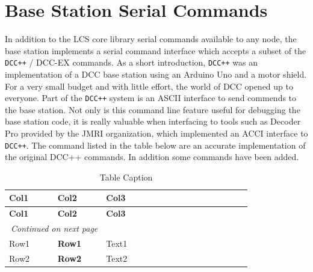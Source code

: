 \section{Base Station Serial Commands}

In addition to the LCS core library serial commands available to any node, the base station implements a serial command interface which accepts a subset of the \texttt{DCC++} / DCC-EX commands. As a short introduction, \texttt{DCC++} was an implementation of a DCC base station using an Arduino Uno and a motor shield. For a very small budget and with little effort, the world of DCC opened up to everyone. Part of the \texttt{DCC++} system is an ASCII interface to send commends to the base station. Not only is this command line feature useful for debugging the base station code, it is really valuable when interfacing to tools such as Decoder Pro provided by the JMRI organization, which implemented an ACCI interface to \texttt{DCC++}. The command listed in the table below are an accurate implementation of the original DCC++ commands. In addition some commands have been added.

\begin{longtable}{@{}|l|p{0.2\linewidth}p{0.6\linewidth}@{}}
    \caption{Table Caption} \\
    \toprule
    \textbf{Col1} & \textbf{Col2} & \textbf{Col3}\\
    \midrule
    \endfirsthead
    \toprule
    \textbf{Col1} & \textbf{Col2} & \textbf{Col3}\\
    \midrule
    \endhead
    \midrule
    \multicolumn{2}{r}{\textit{Continued on next page}} \\
    \midrule
    \endfoot
    \bottomrule
    \endlastfoot
    Row1 & \textbf{Row1} & Text1 \\
    \midrule
    Row2 & \textbf{Row2} & Text2 \\
\end{longtable}


